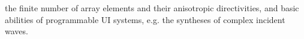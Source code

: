 the finite number of
array elements and
their anisotropic directivities, and
basic abilities of
programmable \ac{UI} systems, e.g.
the syntheses of
complex incident waves.
